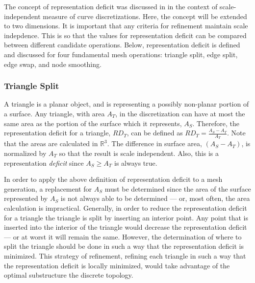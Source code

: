 The concept of representation deficit was discussed in \cite{mclaurin13}
in the context of scale-independent measure of curve discretizations.
Here, the concept will be extended to two dimensions. It is important
that any criteria for refinement maintain scale indepdence. This is so
that the values for representation deficit can be compared between
different candidate operations. Below, representation deficit is defined
and discussed for four fundamental mesh operations: triangle split, edge
split, edge swap, and node smoothing.

\subsubsection{Triangle Split}
A triangle is a planar object, and is representing a possibly non-planar
portion of a surface. Any triangle, with area $A_T$, in the
discretization can have at most the same area as the portion of the
surface which it represents, $A_S$. Therefore, the representation
deficit for a triangle, $RD_T$, can be defined as $RD_T = \frac{A_S -
A_T}{A_T}$. Note that the areas are calculated in ${\mathbb R}^3$. The
difference in surface area, $\left(A_S - A_T\right)$, is normalized by
$A_T$ so that the result is scale independent. Also, this is a
representation {\it deficit} since $A_S \ge A_T$ is always true.

In order to apply the above definition of representation deficit to a
mesh generation, a replacement for $A_S$ must be determined since the
area of the surface represented by $A_S$ is not always able to be
determined --- or, most often, the area calculation is impractical.
Generally, in order to reduce the representation deficit for a triangle
the triangle is split by inserting an interior point. Any point that is
inserted into the interior of the triangle would decrease the
representation deficit --- or at worst it will remain the same. However,
the determination of where to split the triangle should be done in such
a way that the representation deficit is minimized. This strategy of
refinement, refining each triangle in such a way that the representation
deficit is locally minimized, would take advantage of the optimal
substructure the discrete topology.

